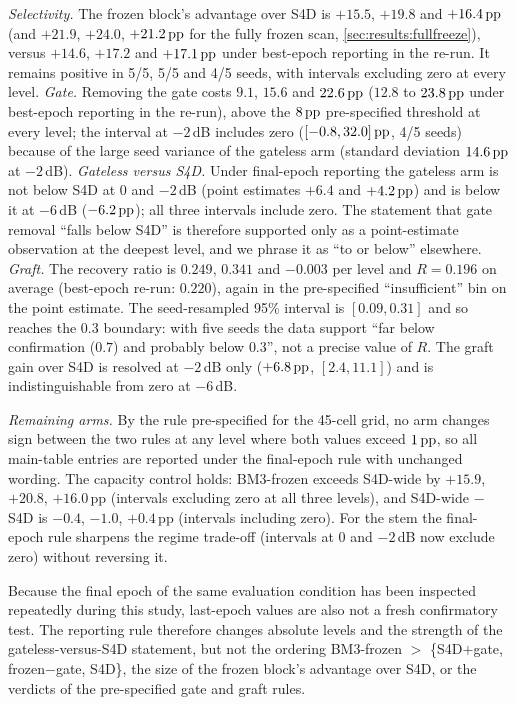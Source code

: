 \emph{Selectivity.} The frozen block's advantage over S4D is $+15.5$, $+19.8$ and $+16.4\,\mathrm{pp}$ (and $+21.9$, $+24.0$, $+21.2\,\mathrm{pp}$ for the fully frozen scan, \ref{sec:results:fullfreeze}), versus $+14.6$, $+17.2$ and $+17.1\,\mathrm{pp}$ under best-epoch reporting in the re-run. It remains positive in 5/5, 5/5 and 4/5 seeds, with intervals excluding zero at every level. \emph{Gate.} Removing the gate costs $9.1$, $15.6$ and $22.6\,\mathrm{pp}$ ($12.8$ to $23.8\,\mathrm{pp}$ under best-epoch reporting in the re-run), above the $8\,\mathrm{pp}$ pre-specified threshold at every level; the interval at $-2$\,dB includes zero ($[-0.8, 32.0]\,\mathrm{pp}$, 4/5 seeds) because of the large seed variance of the gateless arm (standard deviation $14.6\,\mathrm{pp}$ at $-2$\,dB). \emph{Gateless versus S4D.} Under final-epoch reporting the gateless arm is not below S4D at $0$ and $-2$\,dB (point estimates $+6.4$ and $+4.2\,\mathrm{pp}$) and is below it at $-6$\,dB ($-6.2\,\mathrm{pp}$); all three intervals include zero. The statement that gate removal ``falls below S4D'' is therefore supported only as a point-estimate observation at the deepest level, and we phrase it as ``to or below'' elsewhere. \emph{Graft.} The recovery ratio is $0.249$, $0.341$ and $-0.003$ per level and $R = 0.196$ on average (best-epoch re-run: $0.220$), again in the pre-specified ``insufficient'' bin on the point estimate. The seed-resampled 95\% interval is $[0.09, 0.31]$ and so reaches the $0.3$ boundary: with five seeds the data support ``far below confirmation ($0.7$) and probably below $0.3$'', not a precise value of $R$. The graft gain over S4D is resolved at $-2$\,dB only ($+6.8\,\mathrm{pp}$, $[2.4, 11.1]$) and is indistinguishable from zero at $-6$\,dB.

\emph{Remaining arms.} By the rule pre-specified for the 45-cell grid, no arm changes sign between the two rules at any level where both values exceed $1\,\mathrm{pp}$, so all main-table entries are reported under the final-epoch rule with unchanged wording. The capacity control holds: BM3-frozen exceeds S4D-wide by $+15.9$, $+20.8$, $+16.0$\,pp (intervals excluding zero at all three levels), and S4D-wide $-$ S4D is $-0.4$, $-1.0$, $+0.4$\,pp (intervals including zero). For the stem the final-epoch rule sharpens the regime trade-off (intervals at $0$ and $-2$\,dB now exclude zero) without reversing it.

Because the final epoch of the same evaluation condition has been inspected repeatedly during this study, last-epoch values are also not a fresh confirmatory test. The reporting rule therefore changes absolute levels and the strength of the gateless-versus-S4D statement, but not the ordering BM3-frozen $>$ \{S4D+gate, frozen$-$gate, S4D\}, the size of the frozen block's advantage over S4D, or the verdicts of the pre-specified gate and graft rules.

